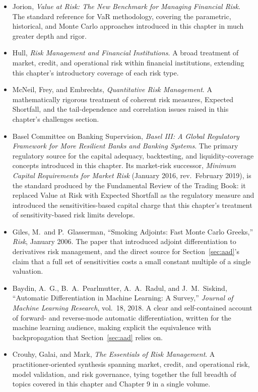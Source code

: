 \documentclass[../ai_in_finance]{subfiles}
\begin{document}
\begin{itemize}
    \item Jorion, \emph{Value at Risk: The New Benchmark for Managing Financial Risk}. The standard reference for VaR methodology, covering the parametric, historical, and Monte Carlo approaches introduced in this chapter in much greater depth and rigor.
    \item Hull, \emph{Risk Management and Financial Institutions}. A broad treatment of market, credit, and operational risk within financial institutions, extending this chapter's introductory coverage of each risk type.
    \item McNeil, Frey, and Embrechts, \emph{Quantitative Risk Management}. A mathematically rigorous treatment of coherent risk measures, Expected Shortfall, and the tail-dependence and correlation issues raised in this chapter's challenges section.
    \item Basel Committee on Banking Supervision, \emph{Basel III: A Global Regulatory Framework for More Resilient Banks and Banking Systems}. The primary regulatory source for the capital adequacy, backtesting, and liquidity-coverage concepts introduced in this chapter. Its market-risk successor, \emph{Minimum Capital Requirements for Market Risk} (January 2016, rev.\ February 2019), is the standard produced by the Fundamental Review of the Trading Book: it replaced Value at Risk with Expected Shortfall as the regulatory measure and introduced the sensitivities-based capital charge that this chapter's treatment of sensitivity-based risk limits develops.
    \item Giles, M.\ and P.\ Glasserman, ``Smoking Adjoints: Fast Monte Carlo Greeks,'' \emph{Risk}, January 2006. The paper that introduced adjoint differentiation to derivatives risk management, and the direct source for Section~\ref{sec:aad}'s claim that a full set of sensitivities costs a small constant multiple of a single valuation.
    \item Baydin, A.\ G., B.\ A.\ Pearlmutter, A.\ A.\ Radul, and J.\ M.\ Siskind, ``Automatic Differentiation in Machine Learning: A Survey,'' \emph{Journal of Machine Learning Research}, vol.\ 18, 2018. A clear and self-contained account of forward- and reverse-mode automatic differentiation, written for the machine learning audience, making explicit the equivalence with backpropagation that Section~\ref{sec:aad} relies on.
    \item Crouhy, Galai, and Mark, \emph{The Essentials of Risk Management}. A practitioner-oriented synthesis spanning market, credit, and operational risk, model validation, and risk governance, tying together the full breadth of topics covered in this chapter and Chapter 9 in a single volume.
\end{itemize}
\end{document}
